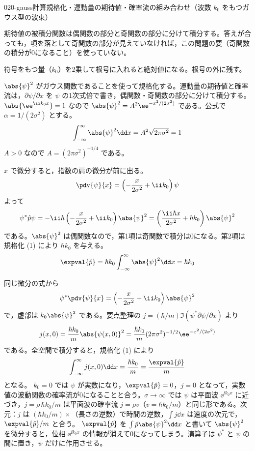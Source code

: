\documentclass[uplatex,dvipdfmx,a4paper,11pt]{jsarticle}
\begin{document}
\begin{mondai}{020-gauss}{計算}{規格化・運動量の期待値・確率流の組み合わせ（波数 $k_{0}$ をもつガウス型の波束）}
\begin{kizuki}
\item 期待値の被積分関数は偶関数の部分と奇関数の部分に分けて積分する。答えが合っても，項を落として奇関数の部分が見えていなければ，この問題の要（奇関数の積分が0になること）を使っていない。
\item 符号をもつ量（$k_{0}$）を2乗して根号に入れると絶対値になる。根号の外に残す。
\end{kizuki}
\begin{tadashii}
\houshin $\abs{\psi}^{2}$ がガウス関数であることを使って規格化する。運動量の期待値と確率流は，$\partial\psi/\partial x$ を $\psi$ の1次式倍で書き，偶関数・奇関数の部分に分けて積分する。
\keisan {} $\abs{\ee^{\ii k_{0}x}}=1$ なので $\abs{\psi}^{2}=A^{2}\ee^{-x^{2}/(2\sigma^{2})}$ である。公式で $\alpha=1/(2\sigma^{2})$ とする。
\[
  \int_{-\infty}^{\infty}\abs{\psi}^{2}\dd x=A^{2}\sqrt{2\pi\sigma^{2}}=1
\]
$A>0$ なので $A=(2\pi\sigma^{2})^{-1/4}$ である。

 $x$ で微分すると，指数の肩の微分が前に出る。
\[
  \pdv{\psi}{x}=\left(-\frac{x}{2\sigma^{2}}+\ii k_{0}\right)\psi
\]
よって
\[
  \psi^{*}\hat{p}\psi=-\ii\hbar\left(-\frac{x}{2\sigma^{2}}+\ii k_{0}\right)\abs{\psi}^{2}
  =\left(\frac{\ii\hbar x}{2\sigma^{2}}+\hbar k_{0}\right)\abs{\psi}^{2}
\]
である。$\abs{\psi}^{2}$ は偶関数なので，第1項は奇関数で積分は0になる。第2項は規格化 (1) により $\hbar k_{0}$ を与える。
\[
  \expval{\hat{p}}=\hbar k_{0}\int_{-\infty}^{\infty}\abs{\psi}^{2}\dd x=\hbar k_{0}
\]

 同じ微分の式から
\[
  \psi^{*}\pdv{\psi}{x}=\left(-\frac{x}{2\sigma^{2}}+\ii k_{0}\right)\abs{\psi}^{2}
\]
で，虚部は $k_{0}\abs{\psi}^{2}$ である。要点整理の $j=(\hbar/m)\allowbreak\Im(\psi^{*}\partial\psi/\partial x)$ より
\[
  j(x,0)=\frac{\hbar k_{0}}{m}\abs{\psi(x,0)}^{2}
  =\frac{\hbar k_{0}}{m}(2\pi\sigma^{2})^{-1/2}\ee^{-x^{2}/(2\sigma^{2})}
\]
である。全空間で積分すると，規格化 (1) により
\[
  \int_{-\infty}^{\infty}j(x,0)\dd x=\frac{\hbar k_{0}}{m}=\frac{\expval{\hat{p}}}{m}
\]
となる。
\kenzan $k_{0}=0$ では $\psi$ が実数になり，$\expval{\hat{p}}=0$，$j=0$ となって，実数値の波動関数の確率流が0になることと合う。$\sigma\to\infty$ では $\psi$ は平面波 $\ee^{\ii k_{0}x}$ に近づき，$j=\rho\,\hbar k_{0}/m$ は平面波の確率流 $j=\rho v$（$v=\hbar k_{0}/m$）と同じ形である。次元：$j$ は $(\hbar k_{0}/m)\times$（長さの逆数）で時間の逆数，$\int j\dd x$ は速度の次元で，$\expval{\hat{p}}/m$ と合う。
\tsumazuki $\expval{\hat{p}}$ を $\int\hat{p}\abs{\psi}^{2}\dd x$ と書いて $\abs{\psi}^{2}$ を微分すると，位相 $\ee^{\ii k_{0}x}$ の情報が消えて0になってしまう。演算子は $\psi^{*}$ と $\psi$ の間に置き，$\psi$ だけに作用させる。
\end{tadashii}
\end{mondai}
\end{document}
